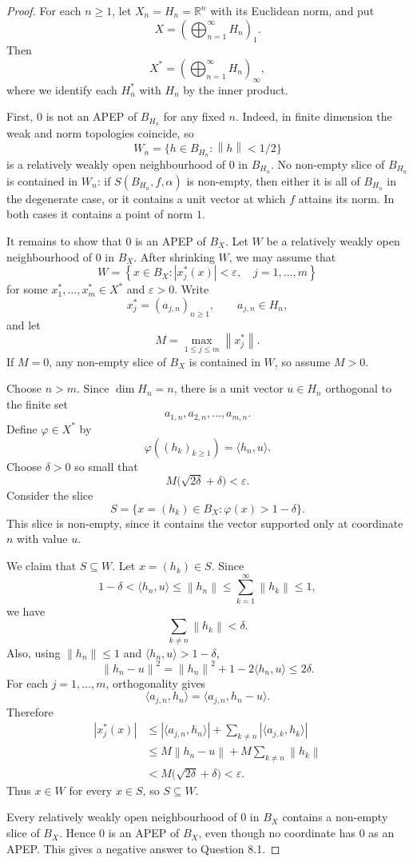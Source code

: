 \documentclass[11pt]{article}
\newcommand{\Ball}{B}
\newcommand{\norm}[1]{\left\lVert #1 \right\rVert}
\newcommand{\R}{\mathbb{R}}
\begin{document}
\begin{proof}
For each $n\ge 1$, let $X_n=H_n=\R^n$ with its Euclidean norm, and put
\[
  X=\left(\bigoplus_{n=1}^{\infty} H_n\right)_1.
\]
Then
\[
  X^*=\left(\bigoplus_{n=1}^{\infty} H_n\right)_\infty,
\]
where we identify each $H_n^*$ with $H_n$ by the inner product.

First, $0$ is not an APEP of $\Ball_{H_n}$ for any fixed $n$. Indeed, in
finite dimension the weak and norm topologies coincide, so
\[
  W_n=\{h\in \Ball_{H_n}:\norm{h}<1/2\}
\]
is a relatively weakly open neighbourhood of $0$ in $\Ball_{H_n}$. No
non-empty slice of $\Ball_{H_n}$ is contained in $W_n$: if
$S(\Ball_{H_n},f,\alpha)$ is non-empty, then either it is all of
$\Ball_{H_n}$ in the degenerate case, or it contains a unit vector at
which $f$ attains its norm. In both cases it contains a point of norm
$1$.

It remains to show that $0$ is an APEP of $\Ball_X$. Let $W$ be a
relatively weakly open neighbourhood of $0$ in $\Ball_X$. After shrinking
$W$, we may assume that
\[
  W=
  \left\{x\in \Ball_X:
  |x_j^*(x)|<\varepsilon,\quad j=1,\dots,m
  \right\}
\]
for some $x_1^*,\dots,x_m^*\in X^*$ and $\varepsilon>0$. Write
\[
  x_j^*=(a_{j,n})_{n\ge 1},\qquad a_{j,n}\in H_n,
\]
and let
\[
  M=\max_{1\le j\le m}\norm{x_j^*}.
\]
If $M=0$, any non-empty slice of $\Ball_X$ is contained in $W$, so assume
$M>0$.

Choose $n>m$. Since $\dim H_n=n$, there is a unit vector $u\in H_n$
orthogonal to the finite set
\[
  a_{1,n},a_{2,n},\dots,a_{m,n}.
\]
Define $\varphi\in X^*$ by
\[
  \varphi((h_k)_{k\ge 1})=\langle h_n,u\rangle.
\]
Choose $\delta>0$ so small that
\[
  M\bigl(\sqrt{2\delta}+\delta\bigr)<\varepsilon.
\]
Consider the slice
\[
  S=\{x=(h_k)\in\Ball_X:\varphi(x)>1-\delta\}.
\]
This slice is non-empty, since it contains the vector supported only at
coordinate $n$ with value $u$.

We claim that $S\subseteq W$. Let $x=(h_k)\in S$. Since
\[
  1-\delta < \langle h_n,u\rangle\le \norm{h_n}\le
  \sum_{k=1}^{\infty}\norm{h_k}\le 1,
\]
we have
\[
  \sum_{k\ne n}\norm{h_k}<\delta.
\]
Also, using $\norm{h_n}\le 1$ and $\langle h_n,u\rangle>1-\delta$,
\[
  \norm{h_n-u}^2
  =
  \norm{h_n}^2+1-2\langle h_n,u\rangle
  \le 2\delta.
\]
For each $j=1,\dots,m$, orthogonality gives
\[
  \langle a_{j,n},h_n\rangle
  =
  \langle a_{j,n},h_n-u\rangle.
\]
Therefore
\[
\begin{aligned}
  |x_j^*(x)|
  &\le |\langle a_{j,n},h_n\rangle|
      + \sum_{k\ne n}|\langle a_{j,k},h_k\rangle|  \\
  &\le M\norm{h_n-u}+M\sum_{k\ne n}\norm{h_k} \\
  &< M\bigl(\sqrt{2\delta}+\delta\bigr)
   < \varepsilon.
\end{aligned}
\]
Thus $x\in W$ for every $x\in S$, so $S\subseteq W$.

Every relatively weakly open neighbourhood of $0$ in $\Ball_X$ contains
a non-empty slice of $\Ball_X$. Hence $0$ is an APEP of $\Ball_X$, even
though no coordinate has $0$ as an APEP. This gives a negative answer to
Question 8.1.
\end{proof}
\end{document}
